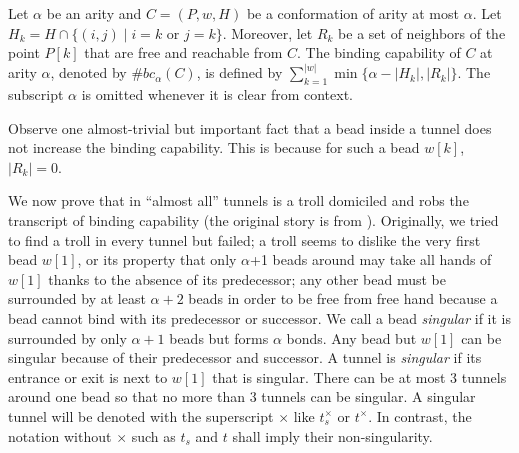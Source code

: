 \begin{definition}
Let $\alpha$ be an arity and $C = (P,w,H)$ be a conformation of arity at most $\alpha$.
Let $H_k = H \cap \{ (i,j) \mid \mbox{$i=k$ or $j=k$} \}$. 
Moreover, let $R_k$ be a set of neighbors of the point $P[k]$ that are free and reachable from $C$.
The binding capability of $C$ at arity $\alpha$, denoted by $\#bc_\alpha(C)$, is defined by $\sum^{|w|}_{k=1} \min \{\alpha-|H_k|, |R_k|\}$.
The subscript $\alpha$ is omitted whenever it is clear from context. 
\end{definition}
%
Observe one almost-trivial but important fact that a bead inside a tunnel does not increase the binding capability. 
This is because for such a bead $w[k]$, $|R_k| = 0$. 

We now prove that in ``almost all'' tunnels is a troll domiciled and robs the transcript of binding capability (the original story is from \cite{Pratchett1992}). 
Originally, we tried to find a troll in every tunnel but failed; a troll seems to dislike the very first bead $w[1]$, or its property that only $\alpha$+1 beads around may take all hands of $w[1]$ thanks to the absence of its predecessor; any other bead must be surrounded by at least $\alpha+2$ beads in order to be free from free hand because a bead cannot bind with its predecessor or successor. 
We call a bead \textit{singular} if it is surrounded by only $\alpha+1$ beads but forms $\alpha$ bonds. 
Any bead but $w[1]$ can be singular because of their predecessor and successor. 
A tunnel is \textit{singular} if its entrance or exit is next to $w[1]$ that is singular. 
There can be at most 3 tunnels around one bead so that no more than 3 tunnels can be singular. 
A singular tunnel will be denoted with the superscript $\times$ like $t_s^\times$ or $t^\times$. 
In contrast, the notation without $\times$ such as $t_s$ and $t$ shall imply their non-singularity. 

